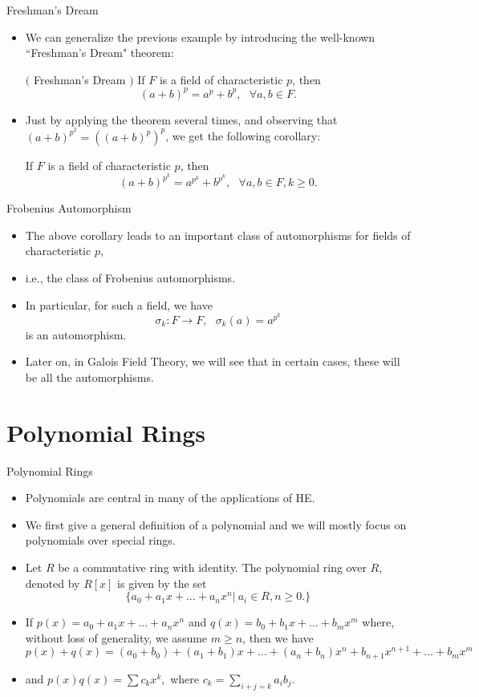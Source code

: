 \documentclass[ %
 10pt, xcolor={dvipsnames,svgnames,x11names,hyperref},
   hyperref={colorlinks=true,citecolor=green,linkcolor=DarkRed,urlcolor=ProcessBlue,anchorcolor=blue}
  ]{beamer}
\newenvironment{stepitemize}{\begin{itemize}[<+->]}{\end{itemize} }
\begin{document}
\begin{frame}{Freshman's Dream}
\begin{stepitemize}
    \item We can generalize the previous example by introducing the well-known ``Freshman's Dream" theorem:
\begin{theorem}$($ Freshman's Dream $)$
If $F$ is a field of characteristic $p$, then 
$$(a+b)^p = a^p+b^p,  \:\:\:\forall a,b \in F.$$
\end{theorem}
\item Just by applying the theorem several times, and observing that $(a+b)^{p^2} = ((a+b)^p)^p$, we get the following corollary:
\begin{corollary}
If $F$ is a field of characteristic $p$, then 
$$(a+b)^{p^k}= a^{p^k}+b^{p^k},  \:\:\:\forall a,b \in F, k\geq 0.$$
\end{corollary}
\end{stepitemize}
\end{frame}

\begin{frame}{Frobenius Automorphism}
    \begin{stepitemize}
    \item The above corollary leads to an important class of automorphisms for fields of characteristic $p$, 
    \item i.e., the class of Frobenius automorphisms. 
    \item In particular, for such a field, we have
$$\sigma_k:F\rightarrow F, \:\:\:\sigma_k(a)=a^{p^k}$$ is an automorphism.
\item Later on, in Galois Field Theory, we will see that in certain cases, these will be all the automorphisms. 
\end{stepitemize}
\end{frame}

\section{Polynomial Rings}
\begin{frame}{Polynomial Rings}
\begin{stepitemize}
\item Polynomials are central in many of the applications of HE.
\item We first give a general definition of a polynomial and we will mostly focus on polynomials over special rings.
\item Let $R$ be a commutative ring with identity. The polynomial ring over $R$, denoted by $R[x]$ is given by the set 
$$\{a_0+a_1x+\dots +a_nx^n| \: a_i\in R, n\geq 0.\}$$
\item If $p(x)=a_0+a_1x+\dots +a_nx^n$ and $q(x)=b_0+b_1x+\dots+b_mx^m$ where, without loss of generality, we assume $m\geq n$, then we have
$$p(x)+q(x) = (a_0+b_0)+(a_1+b_1)x+\dots +(a_n+b_n)x^n+b_{n+1}x^{n+1}+\dots +b_mx^m$$ 
\item and $p(x)q(x) = \sum c_kx^k,$
where $c_k = \sum_{i+j=k}a_ib_j$.
\end{stepitemize}
\end{frame}
\end{document}
